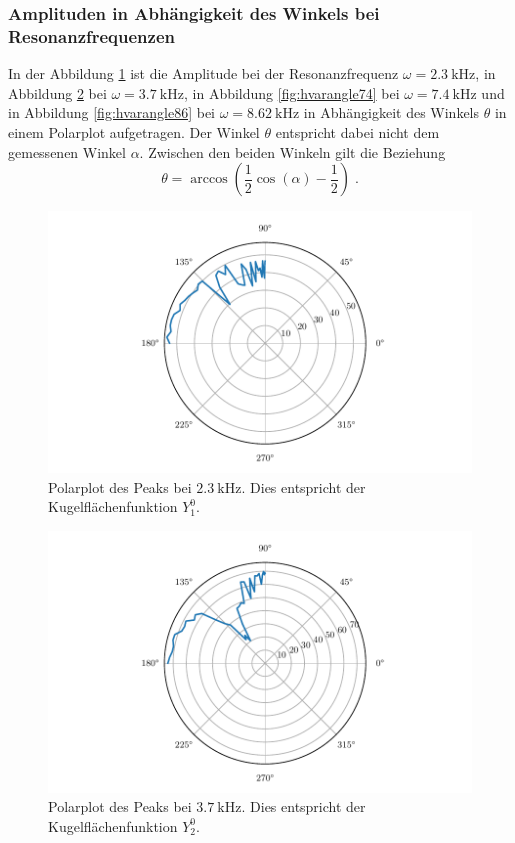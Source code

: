 \subsubsection{Amplituden in Abhängigkeit des Winkels bei Resonanzfrequenzen}
In der Abbildung \ref{fig:hvarangle27} ist die Amplitude bei der Resonanzfrequenz $\omega = \qty{2.3}{\kilo\hertz}$, in Abbildung \ref{fig:hvarangle37} bei
$\omega = \qty{3.7}{\kilo\hertz}$, in Abbildung \ref{fig:hvarangle74} bei $\omega = \qty{7.4}{\kilo\hertz}$ und in Abbildung \ref{fig:hvarangle86} bei 
$\omega = \qty{8.62}{\kilo\hertz}$ in Abhängigkeit 
des Winkels $\theta$ in einem Polarplot aufgetragen.
Der Winkel $\theta$ entspricht dabei nicht dem gemessenen Winkel $\alpha$. Zwischen den beiden Winkeln gilt die Beziehung 
\begin{equation}
    \theta = \arccos \left ( \frac{1}{2} \cos \left ( \alpha \right ) - \frac{1}{2} \right) \; {.}
\end{equation}
\begin{figure}
    \centering
    \includegraphics{build/hvarangle27.pdf}
    \caption{Polarplot des Peaks bei $\qty{2.3}{\kilo\hertz}$. Dies entspricht der Kugelflächenfunktion $Y_1^0$.}
    \label{fig:hvarangle27}
\end{figure}
\begin{figure}
    \centering
    \includegraphics{build/hvarangle37.pdf}
    \caption{Polarplot des Peaks bei $\qty{3.7}{\kilo\hertz}$. Dies entspricht der Kugelflächenfunktion $Y_2^0$.}
    \label{fig:hvarangle37}
\end{figure}
